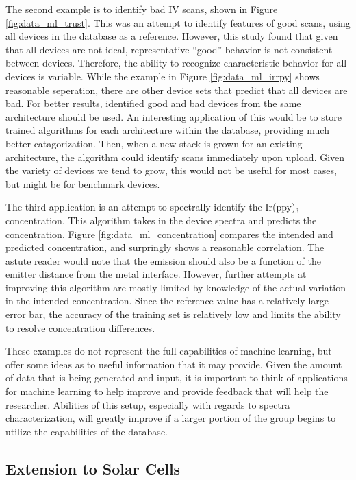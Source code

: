 \documentclass[../thesis.tex]{subfiles}
\begin{document}
The second example is to identify bad IV scans, shown in Figure \ref{fig:data_ml_trust}.
This was an attempt to identify features of good \eqe scans, using all devices in the database as a reference.
However, this study found that given that all devices are not ideal, representative ``good'' behavior is not consistent between devices.
Therefore, the ability to recognize characteristic behavior for all devices is variable.
While the example in Figure \ref{fig:data_ml_irrpy} shows reasonable seperation, there are other device sets that predict that all devices are bad.
For better results, identified good and bad devices from the same architecture should be used.
An interesting application of this would be to store trained algorithms for each architecture within the database, providing much better catagorization.
Then, when a new stack is grown for an existing architecture, the algorithm could identify scans immediately upon upload.
Given the variety of devices we tend to grow, this would not be useful for most cases, but might be for benchmark devices.

The third application is an attempt to spectrally identify the Ir(ppy)$_3$ concentration.
This algorithm takes in the device spectra and predicts the \irppy concentration.
Figure \ref{fig:data_ml_concentration} compares the intended and predicted concentration, and surpringly shows a reasonable correlation.
The astute reader would note that the emission should also be a function of the emitter distance from the metal interface.
However, further attempts at improving this algorithm are mostly limited by knowledge of the actual variation in the intended concentration.
Since the reference value has a relatively large error bar, the accuracy of the training set is relatively low and limits the ability to resolve concentration differences.

These examples do not represent the full capabilities of machine learning, but offer some ideas as to useful information that it may provide.
Given the amount of data that is being generated and input, it is important to think of applications for machine learning to help improve and provide feedback that will help the researcher.  
Abilities of this setup, especially with regards to spectra characterization, will greatly improve if a larger portion of the group begins to utilize the capabilities of the database.


\subsection{Extension to Solar Cells}
\end{document}
